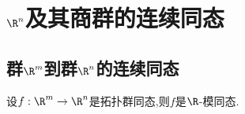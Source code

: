 \chapter{\texorpdfstring{$\R^{n}$}{Rn}及其商群的连续同态}

\section{群\texorpdfstring{$\R^{m}$}{Rm}到群\texorpdfstring{$\R^{n}$}{Rn}的连续同态}

\begin{proposition}{}{}
	设$f:\R^{m}\to\R^{n}$是拓扑群同态,则$f$是$\R$-模同态.
\end{proposition}